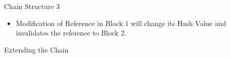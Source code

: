 \documentclass[]{beamer}
\begin{document}
\begin{frame}{Chain Structure 3}

\begin{figure}
	
\end{figure}
\begin{itemize}
\item Modification of Reference in Block 1 will change its Hash Value and invalidates the reference to Block 2.
\end{itemize}
\end{frame}


\begin{frame}{Extending the Chain}
\begin{figure}[h!]
\center
	
\end{figure}
\end{frame}

\end{document}
